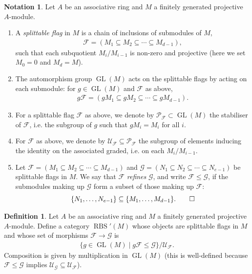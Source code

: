\documentclass[12pt, reqno]{amsart}
\theoremstyle{plain}
\theoremstyle{definition}
\newtheorem{definition}[theorem]{Definition}
\newtheorem{notation}[theorem]{Notation}
\begin{document}
\begin{notation}
Let $A$ be an associative ring and $M$ a finitely generated projective $A$-module.
\begin{enumerate}
\item A \textit{splittable flag} in $M$ is a chain of inclusions of submodules of $M$,
\begin{align*}
\mathcal{F}= (M_1\subseteq M_2\subseteq \cdots \subseteq M_{d-1}),
\end{align*}
such that each subquotient $M_i/M_{i-1}$ is non-zero and projective (here we set $M_0=0$ and $M_d=M$).
\item The automorphism group $\operatorname{GL}(M)$ acts on the splittable flags by acting on each submodule: for $g\in \operatorname{GL}(M)$ and $\mathcal{F}$ as above,
\begin{align*}
g\mathcal{F}= (gM_1\subseteq gM_2\subseteq \cdots \subseteq gM_{d-1}).
\end{align*}
\item For a splittable flag $\mathcal{F}$ as above, we denote by $\mathcal{P}_{\mathcal{F}}\subset \operatorname{GL}(M)$ the stabiliser of $\mathcal{F}$, i.e. the subgroup of $g$ such that $gM_i=M_i$ for all $i$.
\item For $\mathcal{F}$ as above, we denote by $\mathcal{U}_{\mathcal{F}}\subseteq \mathcal{P}_{\mathcal{F}}$ the subgroup of elements inducing the identity on the associated graded, i.e. on each $M_i/M_{i-1}$.
\item Let $\mathcal{F}=(M_1\subseteq M_2\subseteq \cdots \subseteq M_{d-1})$ and $\mathcal{G}=(N_1\subseteq N_2\subseteq \cdots \subseteq N_{e-1})$ be splittable flags in $M$. We say that $\mathcal{F}$ \textit{refines} $\mathcal{G}$, and write $\mathcal{F}\leq \mathcal{G}$, if the submodules making up $\mathcal{G}$ form a subset of those making up $\mathcal{F}$:
\begin{equation*}
\{N_1,\ldots, N_{e-1}\}\subseteq\{M_1,\ldots,M_{d-1}\}.\qedhere
\end{equation*}
\end{enumerate}
\end{notation}

\begin{definition}\label{reductive borel-serre categories}
Let $A$ be an associative ring and $M$ a finitely generated projective $A$-module. Define a category $\operatorname{RBS}'(M)$ whose objects are splittable flags in $M$ and whose set of morphisms $\mathcal{F}\rightarrow \mathcal{G}$ is
\begin{align*}
\{g\in \operatorname{GL}(M)\mid g\mathcal{F}\leq \mathcal{G}\}/\mathcal{U}_{\mathcal{F}}.
\end{align*}
Composition is given by multiplication in $\operatorname{GL}(M)$ (this is well-defined because $\mathcal{F}\leq \mathcal{G}$ implies $\mathcal{U}_\mathcal{G}\subseteq \mathcal{U}_\mathcal{F}$).
\end{definition}
\end{document}
